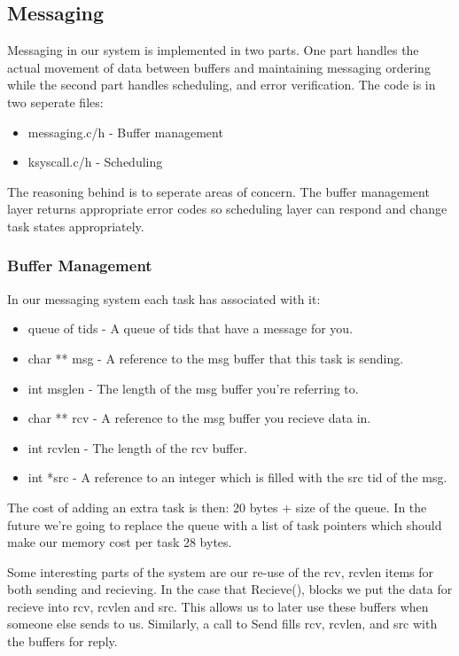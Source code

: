 \documentclass{article}
\begin{document}
\subsection{Messaging}

Messaging in our system is implemented in two parts. One part handles the actual movement of data between buffers and maintaining messaging ordering while the second part handles scheduling, and error verification. The code is in two seperate files:
\begin{itemize}
    \item messaging.{c/h} - Buffer management
    \item ksyscall.{c/h} - Scheduling
\end{itemize}
The reasoning behind is to seperate areas of concern. The buffer management layer returns appropriate error codes so scheduling layer can respond and change task states appropriately.

\subsubsection{Buffer Management}

In our messaging system each task has associated with it:
\begin{itemize}
    \item queue of tids - A queue of tids that have a message for you.
    \item char ** msg - A reference to the msg buffer that this task is sending.
    \item int msglen - The length of the msg buffer you're referring to.
    \item char ** rcv - A reference to the msg buffer you recieve data in.
    \item int rcvlen - The length of the rcv buffer.
    \item int *src - A reference to an integer which is filled with the src tid of the msg.
\end{itemize}

The cost of adding an extra task is then: 20 bytes + size of the queue. In the future we're going to replace the queue with a list of task pointers which should make our memory cost per task 28 bytes.

Some interesting parts of the system are our re-use of the rcv, rcvlen items for both sending and recieving. In the case that Recieve(), blocks we put the data for recieve into rcv, rcvlen and src. This allows us to later use these buffers when someone else sends to us. Similarly, a call to Send fills rcv, rcvlen, and src with the buffers for reply.
\end{document}
